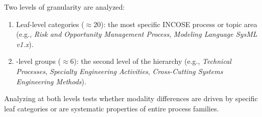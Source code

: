 Two levels of granularity are analyzed:

\begin{enumerate}[nosep]
    \item Leaf-level categories ($\approx$20): the most specific INCOSE process or topic area (e.g., \textit{Risk and Opportunity Management Process}, \textit{Modeling Language SysML v1.x}).
    \item \Top-level groups ($\approx$6): the second level of the hierarchy (e.g., \textit{Technical Processes}, \textit{Specialty Engineering Activities}, \textit{Cross-Cutting Systems Engineering Methods}).
\end{enumerate}

Analyzing at both levels tests whether modality differences are driven by specific leaf categories or are systematic properties of entire process families.

